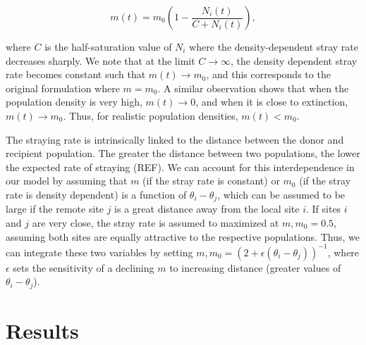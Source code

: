 \documentclass[twocolumn,preprintnumbers,amsmath,amssymb,superscriptaddress]{revtex4}
\begin{document}
\begin{equation}
  m(t) = m_0\left(1- \frac{N_i(t)}{C+N_i(t)}\right),
  \label{eq:ddm}
\end{equation}

\noindent where $C$ is the half-saturation value of $N_i$ where the density-dependent stray rate decreases sharply.
We note that at the limit $C\rightarrow \infty$, the density dependent stray rate becomes constant such that $m(t) \rightarrow m_0$, and this corresponds to the original formulation where $m=m_0$.
A similar observation shows that when the population density is very high, $m(t) \rightarrow 0$, and when it is close to extinction, $m(t) \rightarrow m_0$.
Thus, for realistic population densities, $m(t) < m_0$.


The straying rate is intrinsically linked to the distance between the donor and recipient population.
The greater the distance between two populations, the lower the expected rate of straying (REF).
We can account for this interdependence in our model by assuming that $m$ (if the stray rate is constant) or $m_0$ (if the stray rate is density dependent) is a function of $\theta_i-\theta_j$, which can be assumed to be large if the remote site $j$ is a great distance away from the local site $i$.
If sites $i$ and $j$ are very close, the stray rate is assumed to maximized at $m,m_0 = 0.5$, assuming both sites are equally attractive to the respective populations.
Thus, we can integrate these two variables by setting $m,m_0 = (2 + \epsilon (\theta_i-\theta_j))^{-1}$, where $\epsilon$ sets the sensitivity of a declining $m$ to increasing distance (greater values of $\theta_i-\theta_j$).



\section{Results}

\end{document}
